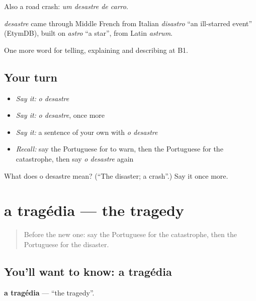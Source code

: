 Also a road crash: \emph{um desastre de carro}.

\begin{cousinweb}
\emph{desastre} came through Middle French from Italian \emph{disastro} \textquotedblleft{}an ill-starred event\textquotedblright{} (EtymDB), built on \emph{astro} \textquotedblleft{}a star\textquotedblright{}, from Latin \emph{astrum}.
\end{cousinweb}

\begin{grammarlens}[title={What you've built}]
One more word for telling, explaining and describing at B1.
\end{grammarlens}

\subsection*{Your turn}
\begin{itemize}
\raggedright
  \item \emph{Say it:} \emph{o desastre}
  \item \emph{Say it:} \emph{o desastre}, once more
  \item \emph{Say it:} a sentence of your own with \emph{o desastre}
  \item \emph{Recall:} say the Portuguese for to warn, then the Portuguese for the catastrophe, then say \emph{o desastre} again
\end{itemize}

\begin{tcolorbox}[breakable,colback=teal!4,colframe=teal!35!black,title={Before you move on}]
What does o desastre mean? (\textquotedblleft{}The disaster; a crash\textquotedblright{}.) Say it once more.
\end{tcolorbox}
\section[a tragédia]{a tragédia — the tragedy}

\label{lesson:PT-C304-tragedia}



\begin{quote}
Before the new one: say the Portuguese for the catastrophe, then the Portuguese for the disaster.
\end{quote}

\subsection*{You'll want to know: a tragédia}
\textbf{a tragédia} — \textquotedblleft{}the tragedy\textquotedblright{}.


